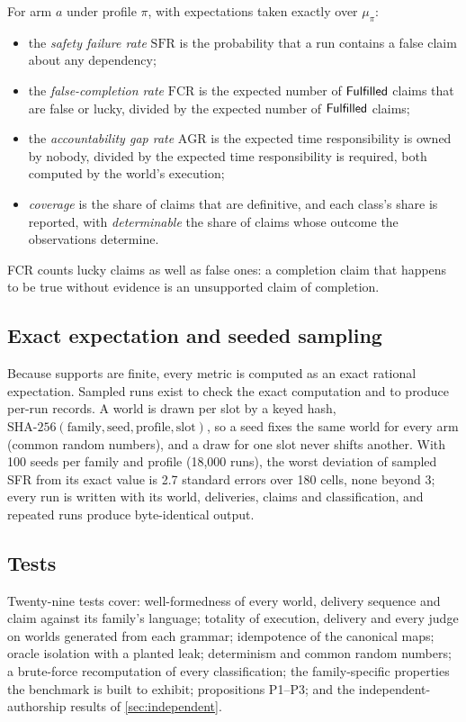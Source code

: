For arm $a$ under profile $\pi$, with expectations taken exactly over $\mu_\pi$:
\begin{itemize}
\item the \emph{safety failure rate} $\mathrm{SFR}$ is the probability that a run contains a false claim about any dependency;
\item the \emph{false-completion rate} $\mathrm{FCR}$ is the expected number of $\mathsf{Fulfilled}$ claims that are false or lucky, divided by the expected number of $\mathsf{Fulfilled}$ claims;
\item the \emph{accountability gap rate} $\mathrm{AGR}$ is the expected time responsibility is owned by nobody, divided by the expected time responsibility is required, both computed by the world's execution;
\item \emph{coverage} is the share of claims that are definitive, and each class's share is reported, with \emph{determinable} the share of claims whose outcome the observations determine.
\end{itemize}
FCR counts lucky claims as well as false ones: a completion claim that happens to be true without evidence is an unsupported claim of completion.

\subsection{Exact expectation and seeded sampling}

Because supports are finite, every metric is computed as an exact rational expectation. Sampled runs exist to check the exact computation and to produce per-run records. A world is drawn per slot by a keyed hash, $\mathrm{SHA\text{-}256}(\text{family}, \text{seed}, \text{profile}, \text{slot})$, so a seed fixes the same world for every arm (common random numbers), and a draw for one slot never shifts another. With 100 seeds per family and profile (18,000 runs), the worst deviation of sampled SFR from its exact value is 2.7 standard errors over 180 cells, none beyond 3; every run is written with its world, deliveries, claims and classification, and repeated runs produce byte-identical output.

\subsection{Tests}

Twenty-nine tests cover: well-formedness of every world, delivery sequence and claim against its family's language; totality of execution, delivery and every judge on worlds generated from each grammar; idempotence of the canonical maps; oracle isolation with a planted leak; determinism and common random numbers; a brute-force recomputation of every classification; the family-specific properties the benchmark is built to exhibit; propositions P1--P3; and the independent-authorship results of \cref{sec:independent}.
